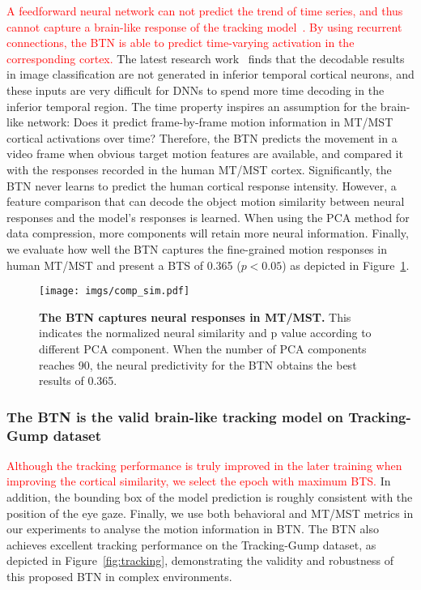 \documentclass[final,3p,times,twocolumn]{elsarticle}
\begin{document}
\textcolor{red}{
A feedforward neural network can not predict the trend of time series, 
and thus cannot capture a brain-like response of the tracking model~\cite{kar2019evidence, TangSchrimpfLotter2018Recurrent}.
By using recurrent connections, the BTN is able to predict time-varying activation in the corresponding cortex.}
The latest research work~\cite{kar2019evidence} finds that the decodable results in image classification are not generated in inferior temporal cortical neurons, 
and these inputs are very difficult for DNNs to spend more time decoding in the inferior temporal region. 
The time property inspires an assumption for the brain-like network: 
Does it predict frame-by-frame motion information in MT/MST cortical activations over time? 
Therefore, the BTN predicts the movement in a video frame when obvious target motion features are available,
and compared it with the responses recorded in the human MT/MST cortex.
Significantly, the BTN never learns to predict the human cortical response intensity.
However, a feature comparison that can decode the object motion similarity between neural responses and the model's responses is learned. 
When using the PCA method for data compression, more components will retain more neural information.
Finally, we evaluate how well the BTN captures the fine-grained motion responses in human MT/MST and present a BTS of 0.365 ($p < 0.05$) as depicted in Figure~\ref{fig:neural_predictivity}.

\begin{figure}[t]
	\centering
	\texttt{[image: imgs/comp\_sim.pdf]}
	\caption{
		\textbf{
		The BTN captures neural responses in MT/MST.
		}
		This indicates the normalized neural similarity and p value according to different PCA component. 
		When the number of PCA components reaches 90, the neural predictivity for the BTN obtains the best results of 0.365. 
	}
	\label{fig:neural_predictivity}
\end{figure}


\subsubsection{The BTN is the valid brain-like tracking model on Tracking-Gump dataset}
\textcolor{red}{
Although the tracking performance is truly improved in the later training when improving the cortical similarity, we select the epoch with maximum BTS.}
In addition, the bounding box of the model prediction is roughly consistent with the position of the eye gaze. 
Finally, we use both behavioral and MT/MST metrics in our experiments to analyse the motion information in BTN. 
The BTN also achieves excellent tracking performance on the Tracking-Gump dataset, as depicted in Figure~\ref{fig:tracking}, demonstrating the validity and robustness of this proposed BTN in complex environments. 
\end{document}
